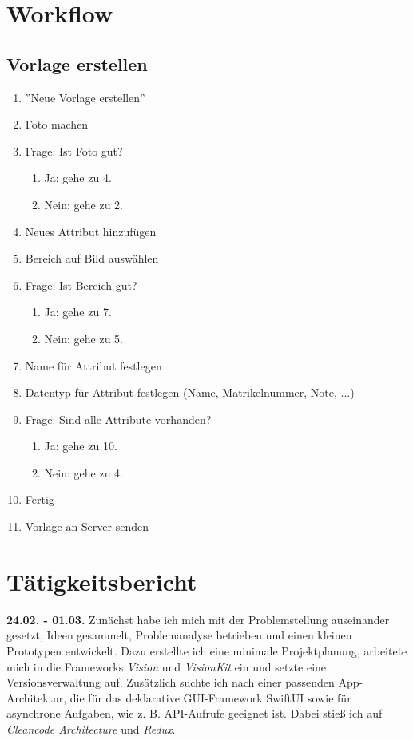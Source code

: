 \documentclass[notables, nomenclature, oneside, 150]{HSMW-Thesis}
\begin{document}
\Anhang

\chapter{Workflow} \label{ch:workflow}
	\section*{Vorlage erstellen}
	\begin{enumerate}
		\item ''Neue Vorlage erstellen''
		\item Foto machen
		\item Frage: Ist Foto gut? 
		\begin{enumerate}
			\item Ja: gehe zu 4.
			\item Nein: gehe zu 2.
		\end{enumerate}
		\item Neues Attribut hinzufügen
		\item Bereich auf Bild auswählen
		\item Frage: Ist Bereich gut?
		\begin{enumerate}
			\item Ja: gehe zu 7.
			\item Nein: gehe zu 5.
		\end{enumerate}
		\item Name für Attribut festlegen
		\item Datentyp für Attribut festlegen (Name, Matrikelnummer, Note, ...)
		\item Frage: Sind alle Attribute vorhanden?
		\begin{enumerate}
			\item Ja: gehe zu 10.
			\item Nein: gehe zu 4.
		\end{enumerate}
		\item Fertig
		\item Vorlage an Server senden
	\end{enumerate}
	

\chapter{Tätigkeitsbericht}
	\textbf{24.02. - 01.03.}
	Zunächst habe ich mich mit der Problemstellung auseinander gesetzt, Ideen gesammelt, Problemanalyse betrieben und einen kleinen Prototypen entwickelt. Dazu erstellte ich eine minimale Projektplanung, arbeitete mich in die Frameworks \textit{Vision} und \textit{VisionKit} ein und setzte eine Versionsverwaltung auf. Zusätzlich suchte ich nach einer passenden App-Architektur, die für das deklarative GUI-Framework SwiftUI sowie für asynchrone Aufgaben, wie z. B. API-Aufrufe geeignet ist. Dabei stieß ich auf \textit{Cleancode Architecture} und \textit{Redux}.
	
\end{document}
